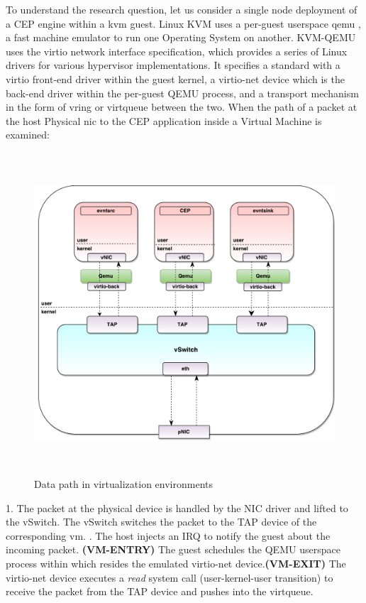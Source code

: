 To understand the research question, let us consider a single node deployment of a CEP engine within a \ac{kvm} \cite{kivity2007kvm} guest. Linux KVM uses a per-guest userspace \ac{qemu} \cite{bellard2005qemu}, a fast machine emulator to run one Operating System on another. KVM-QEMU uses the virtio \cite{russell2008virtio} network interface specification, which provides a series of Linux drivers for various hypervisor implementations. It specifies a standard with a virtio front-end driver within the guest kernel, a virtio-net device which is the back-end driver within the per-guest QEMU process, and a transport mechanism in the form of vring or virtqueue between the two. When the path of a packet at the host Physical \ac{nic} to the CEP application inside a Virtual Machine is examined: 
 \begin{figure}[H]
 \centering
 \caption{Data path in virtualization environments} 
 \includegraphics[height=12cm]{Vswitch05.pdf}
\end{figure}
1. The packet at the physical device is handled by the NIC driver and lifted to the vSwitch. The vSwitch switches the packet to the TAP device of the corresponding \ac{vm}. \newline {}. The host injects an IRQ to notify the guest about the incoming packet. \textbf{(VM-ENTRY)} The guest schedules the QEMU userspace process within which resides  the emulated virtio-net device.\textbf{(VM-EXIT)} The virtio-net device executes a \textit{read} system call (user-kernel-user transition) to receive the packet from the TAP device and pushes into the virtqueue.   \newline \newline 
